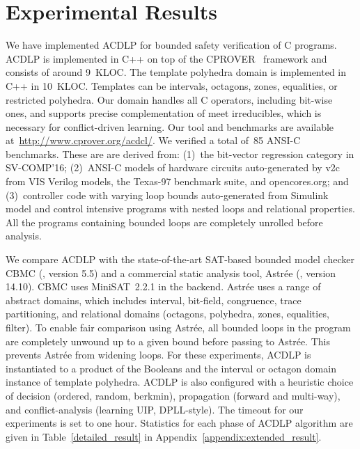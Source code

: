 \section{Experimental Results}
%
We have implemented ACDLP for bounded safety verification of C programs.  
ACDLP is implemented in C++ on top of the
\textsc{CPROVER}~\cite{cprover} framework and consists of around 9~KLOC. 
The template polyhedra domain is implemented in C++ in 10~KLOC.  Templates
can be intervals, octagons, zones, equalities, or restricted polyhedra.  Our
domain handles all C operators, including bit-wise ones, and supports
precise complementation of meet irreducibles, which is necessary for
conflict-driven learning.  Our tool and benchmarks are available 
at~\url{http://www.cprover.org/acdcl/}.
%
We verified a total of~85 ANSI-C benchmarks.  These are are derived from:
(1)~the bit-vector regression category in SV-COMP'16; (2)~ANSI-C models of
hardware circuits auto-generated by v2c~\cite{mtk2016} from VIS Verilog
models, the Texas-97 benchmark suite, and opencores.org; and (3)~controller 
code with varying loop bounds auto-generated from Simulink model and control 
intensive programs with nested loops and relational properties. 
All the programs containing bounded loops are completely unrolled before
analysis.

We compare ACDLP with the state-of-the-art SAT-based bounded model checker
CBMC (\cite{cbmc}, version 5.5) and a commercial static analysis tool,
Astr{\'e}e (\cite{astree}, version 14.10).  CBMC uses MiniSAT~2.2.1 in the
backend.  Astr{\'e}e uses a range of abstract domains, which includes
interval, bit-field, congruence, trace partitioning, and relational domains
(octagons, polyhedra, zones, equalities, filter).  To enable fair comparison
using Astr{\'e}e, all bounded loops in the program are completely unwound up
to a given bound before passing to Astr{\'e}e.  This prevents Astr{\'e}e
from widening loops.
%
For these experiments, ACDLP is instantiated to a product of the Booleans
and the interval or octagon domain instance of template polyhedra.  ACDLP is
also configured with a heuristic choice of decision (ordered, random, berkmin), 
propagation (forward and multi-way), and conflict-analysis (learning UIP, 
DPLL-style).  The timeout for our experiments is set to one hour.  Statistics 
for each phase of ACDLP algorithm are given in Table~\ref{detailed_result} 
in Appendix~\ref{appendix:extended_result}.  
%

